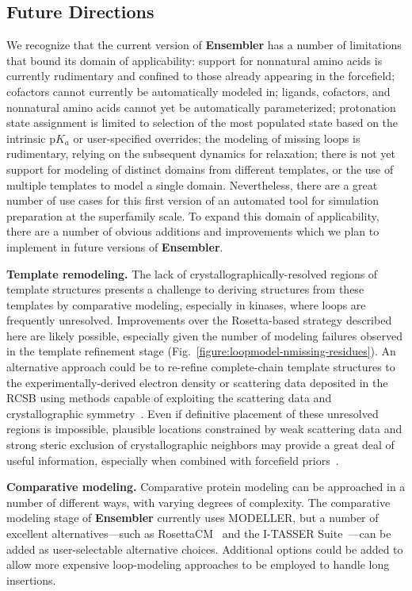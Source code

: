 \documentclass[aps,pre,twocolumn,nofootinbib,superscriptaddress,linenumbers]{revtex4-1}
\begin{document}
\subsection*{Future Directions}

\color{red}
We recognize that the current version of {\bf Ensembler} has a number of limitations that bound its domain of applicability: support for nonnatural amino acids is currently rudimentary and confined to those already appearing in the forcefield; cofactors cannot currently be automatically modeled in; ligands, cofactors, and nonnatural amino acids cannot yet be automatically parameterized; protonation state assignment is limited to selection of the most populated state based on the intrinsic p$K_a$ or user-specified overrides; the modeling of missing loops is rudimentary, relying on the subsequent dynamics for relaxation; there is not yet support for modeling of distinct domains from different templates, or the use of multiple templates to model a single domain.
Nevertheless, there are a great number of use cases for this first version of an automated tool for simulation preparation at the superfamily scale.
To expand this domain of applicability, there are a number of obvious additions and improvements which we plan to implement in future versions of {\bf Ensembler}.

{\bf Template remodeling.}
The lack of crystallographically-resolved regions of template structures presents a challenge to deriving structures from these templates by comparative modeling, especially in kinases, where loops are frequently unresolved.
Improvements over the Rosetta-based strategy described here are likely possible, especially given the number of modeling failures observed in the template refinement stage (Fig.~\ref{figure:loopmodel-nmissing-residues}).
An alternative approach could be to re-refine complete-chain template structures to the experimentally-derived electron density or scattering data deposited in the RCSB using methods capable of exploiting the scattering data and crystallographic symmetry~\cite{schnieders:biophys-j:2010:x-ray-refinement}.
Even if definitive placement of these unresolved regions is impossible, plausible locations constrained by weak scattering data and strong steric exclusion of crystallographic neighbors may provide a great deal of useful information, especially when combined with forcefield priors~\cite{schnieders:jctc:2011:space-group-pme}.

{\bf Comparative modeling.}
Comparative protein modeling can be approached in a number of different ways, with varying degrees of complexity.
The comparative modeling stage of {\bf Ensembler} currently uses MODELLER, but a number of excellent alternatives---such as RosettaCM~\cite{baker:structure:2013:rosettacm} and the I-TASSER Suite~\cite{yang:nature-methods:2015:i-tasser-suite}---can be added as user-selectable alternative choices.
Additional options could be added to allow more expensive loop-modeling approaches to be employed to handle long insertions.
\end{document}

